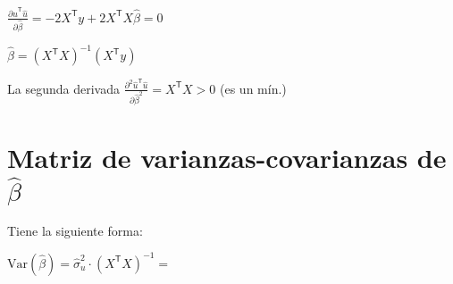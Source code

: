 \documentclass[10pt, a4paper, landscape]{article}
\newcommand{\Var}{\mathrm{Var}}
\newcommand{\tr}{\mathsf{T}}
\begin{document}
\begin{multicols}{3}
\begin{itemize}[leftmargin=*]
			\begin{center}
				$\frac{\partial \hat{u}^{\tr} \hat{u}}{\partial \hat{\beta}} = -2 X^{\tr} y + 2 X^{\tr} X \hat{\beta} = 0$
				
				$\hat{\beta} = (X^{\tr} X)^{-1} (X^{\tr} y)$
				
			\end{center}
			
			La segunda derivada $\frac{\partial^{2} \hat{u}^{\tr} \hat{u}}{\partial \hat{\beta}^{2}} = X^{\tr} X > 0$ (es un mín.)
		\end{itemize}
		
		\section*{Matriz de varianzas-covarianzas de $\hat{\beta}$}
		
		Tiene la siguiente forma:
		
		\begin{center}
			$\Var(\hat{\beta}) = \hat{\sigma}^{2}_{u} \cdot (X^{\tr} X)^{-1}=$
		\end{center}
		

\end{multicols}
\end{document}
